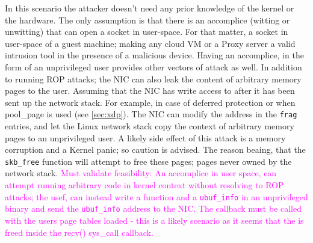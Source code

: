 In this scenario the attacker doesn't need any prior knowledge of the kernel or the hardware. The only assumption is that there is an accomplice (witting or unwitting) that can open a socket in user-space. For that matter, a socket in user-space of a guest machine; making any cloud VM or a Proxy server a valid intrusion tool in the presence of a malicious device.\newline
Having an accomplice, in the form of an unprivileged user provides other vectors of attack as well. In addition to running ROP attacks; the NIC can also leak the content of arbitrary memory pages to the user. Assuming that the NIC has write access to \shinfo after it has been sent up the network stack. For example, in case of deferred protection or when pool\_page is used (see \ref{sec:xdp}). The NIC can modify the \page address in the \texttt{frag} entries, and let the Linux network stack copy the context of arbitrary memory pages to an unprivileged user. A likely side effect of this attack is a memory corruption and a Kernel panic; so caution is advised. The reason beaing, that the \texttt{skb\_free} function will attempt to free these pages; pages never owned by the network stack.
\newline
\textcolor{magenta}{Must validate feasibility: An accomplice in user space, can attempt running arbitrary code in kernel context without resolving to ROP attacks; the usef, can instead write a function and a \texttt{ubuf\_info} in an unprivileged binary and send the \texttt{ubuf\_info} address to the NIC. The \shinfo callback must be called with the users page tables loaded - this is a likely scenario as it seems that the \skb is freed inside the recv() sys\_call callback.}

